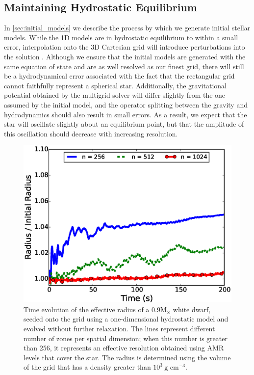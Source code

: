 \documentclass[iop]{../emulateapj}
\newcommand{\msolar}{\mathrm{M}_\odot}
\begin{document}
\subsection{Maintaining Hydrostatic Equilibrium}\label{sec:HSE}

In \autoref{sec:initial_models} we describe the process by which
we generate initial stellar models. While the 1D models are in
hydrostatic equilibrium to within a small error, interpolation onto
the 3D Cartesian grid will introduce perturbations into the solution
\citep{zingale:2002}. Although we ensure that the initial models are
generated with the same equation of state and are as well resolved as
our finest grid, there will still be a hydrodynamical error associated
with the fact that the rectangular grid cannot faithfully represent a
spherical star. Additionally, the gravitational potential obtained by
the multigrid solver will differ slightly from the one assumed by the
initial model, and the operator splitting between the gravity and
hydrodynamics should also result in small errors. As a result, we
expect that the star will oscillate slightly about an equilibrium
point, but that the amplitude of this oscillation should decrease with
increasing resolution.

\begin{figure}
  \centering
  \includegraphics[scale=0.45]{plots/single_star_static_1e3_radius}
  \caption{Time evolution of the effective radius of a $0.9 \msolar$ 
    white dwarf, seeded onto the grid using a one-dimensional hydrostatic
    model and evolved without further relaxation. The lines represent 
    different number of zones per spatial dimension; when this number is 
    greater than 256, it represents an effective resolution obtained 
    using AMR levels that cover the star. The radius is determined 
    using the volume of the grid that has a density greater than $10^3\ \text{g cm}^{-3}.$
    \label{fig:single_star_static_radius}}
\end{figure}
\end{document}
